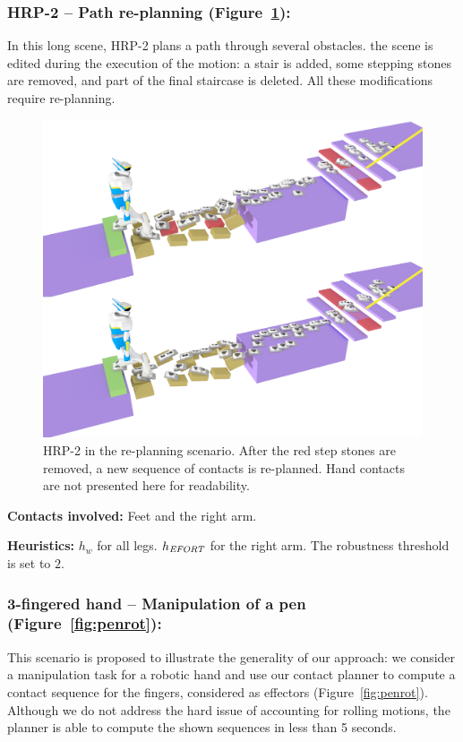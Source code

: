 \subsubsection{HRP-2 -- Path re-planning (Figure~\ref{fig:re-planning}):}
In this long scene, HRP-2 plans a path through several obstacles. the scene is edited during the execution of the motion: a stair is added,
some stepping stones are removed, and part of the final staircase is deleted. All these modifications require re-planning.


\begin{figure}
  \centering
  \includegraphics[width=0.7\linewidth]{figures/replanning}
  \caption{
           HRP-2 in the re-planning scenario. After the red step stones are removed, a new sequence of contacts is re-planned. Hand contacts
           are not presented here for readability.}
		   \label{fig:re-planning}
\end{figure}

\noindent\textbf{Contacts involved:} Feet and the right arm.

\noindent\textbf{Heuristics:} $h_w$  for all legs. $h_{\textrm{\it EFORT}}$  for the right arm. The robustness threshold is set to $2$.



\subsubsection{3-fingered hand -- Manipulation of a pen (Figure~\ref{fig:penrot}):}
This scenario is proposed to illustrate the generality of our approach: we consider a manipulation task for a robotic hand and use
our contact planner to compute a contact sequence for the fingers, considered as effectors (Figure~\ref{fig:penrot}).
Although we do not address the hard issue of accounting for rolling motions, the planner is able to compute the shown sequences in less than 5 seconds.

